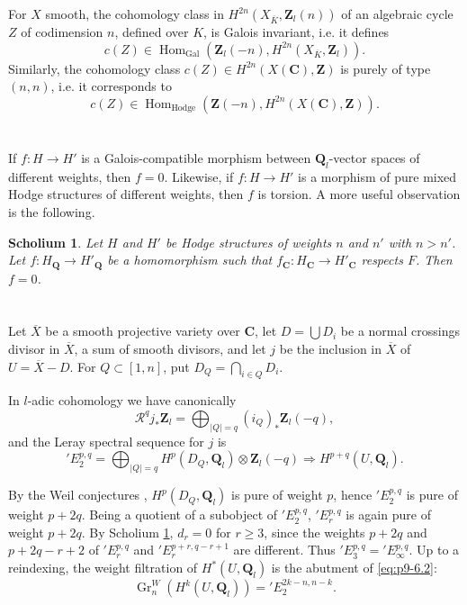 \documentclass[11pt]{amsart}
\theoremstyle{plain}
\newtheorem{scholium}[theorem]{Scholium}
\theoremstyle{definition}
\theoremstyle{remark}
\DeclareMathOperator{\Hom}{Hom}
\DeclareMathOperator{\Gr}{Gr}
\DeclareMathOperator{\Gal}{Gal}
\newcommand{\Q}{\mathbf{Q}}
\newcommand{\Z}{\mathbf{Z}}
\newcommand{\C}{\mathbf{C}}
\begin{document}
For $X$ smooth, the cohomology class in $H^{2n}(X_{\overline K},\Z_l(n))$ of an algebraic cycle $Z$ of codimension $n$, defined over $K$, is Galois invariant, i.e. it defines
\[
c(Z)\in \Hom_{\Gal}(\Z_l(-n),H^{2n}(X_{\overline K},\Z_l)).
\]
Similarly, the cohomology class $c(Z)\in H^{2n}(X(\C),\Z)$ is purely of type $(n,n)$, i.e. it corresponds to
\[
c(Z)\in \Hom_{\mathrm{Hodge}}(\Z(-n),H^{2n}(X(\C),\Z)).
\]

\section{}\label{sec:p9-5}
If $f:H\to H'$ is a Galois-compatible morphism between $\Q_l$-vector spaces of different weights, then $f=0$. Likewise, if $f:H\to H'$ is a morphism of pure mixed Hodge structures of different weights, then $f$ is torsion. A more useful observation is the following.

\begin{scholium}\label{sch:p9-5.1}
Let $H$ and $H'$ be Hodge structures of weights $n$ and $n'$ with $n>n'$. Let $f:H_\Q\to H'_\Q$ be a homomorphism such that $f_\C:H_\C\to H'_\C$ respects $F$. Then $f=0$.
\end{scholium}

\section{}\label{sec:p9-6}
Let $\overline X$ be a smooth projective variety over $\C$, let $D=\bigcup D_i$ be a normal crossings divisor in $\overline X$, a sum of smooth divisors, and let $j$ be the inclusion in $\overline X$ of $U=\overline X-D$. For $Q\subset[1,n]$, put $D_Q=\bigcap_{i\in Q}D_i$.

In $l$-adic cohomology we have canonically
\begin{equation}\label{eq:p9-6.1}
\mathscr R^qj_*\Z_l=\bigoplus_{|Q|=q}(i_Q)_*\Z_l(-q),
\end{equation}
and the Leray spectral sequence for $j$ is
\begin{equation}\label{eq:p9-6.2}
{}'E_2^{p,q}=\bigoplus_{|Q|=q}H^p(D_Q,\Q_l)\otimes \Z_l(-q)\Rightarrow H^{p+q}(U,\Q_l).
\end{equation}

By the Weil conjectures \cite{Weil}, $H^p(D_Q,\Q_l)$ is pure of weight $p$, hence ${}'E_2^{p,q}$ is pure of weight $p+2q$. Being a quotient of a subobject of ${}'E_2^{p,q}$, ${}'E_r^{p,q}$ is again pure of weight $p+2q$. By Scholium \ref{sch:p9-5.1}, $d_r=0$ for $r\ge3$, since the weights $p+2q$ and $p+2q-r+2$ of ${}'E_r^{p,q}$ and ${}'E_r^{p+r,q-r+1}$ are different. Thus ${}'E_3^{p,q}={}'E_\infty^{p,q}$. Up to a reindexing, the weight filtration of $H^*(U,\Q_l)$ is the abutment of \eqref{eq:p9-6.2}:
\begin{equation}\label{eq:p9-6.3}
\Gr_n^W(H^k(U,\Q_l))={}'E_2^{2k-n,n-k}.
\end{equation}
\end{document}

